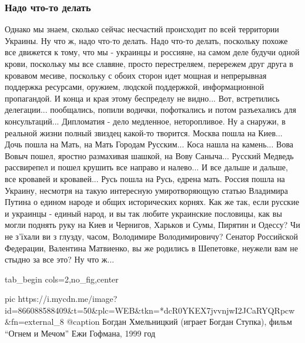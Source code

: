  
 
 
 
 

\subsubsection{Надо что-то делать}

Однако мы знаем, сколько сейчас несчастий происходит по всей территории
Украины. Ну что ж, надо что-то делать. Надо что-то делать, поскольку похоже все
движется к тому, что мы - украинцы и россияне, на самом деле будучи одной
крови, поскольку мы все славяне, просто перестреляем, перережем друг друга в
кровавом месиве, поскольку с обоих сторон идет мощная и непрерывная поддержка
ресурсами, оружием, людской поддержкой, информационной пропагандой. И конца и
края этому беспределу не видно... Вот, встретились делегации... пообщались,
попили водички, пофоткались и потом разъехались для консультаций... Дипломатия
- дело медленное, неторопливое. Ну а снаружи, в реальной жизни полный звиздец
какой-то творится. Москва пошла на Киев... Дочь пошла на Мать, на Мать Городам
Русским... Коса нашла на камень... Вова Вовыч пошел, яростно размахивая шашкой,
на Вову Саныча... Русский Медведь рассвирепел и пошел крушить все направо и
налево... И все дальше и дальше, все кровавей и кровавей... Русь пошла на Русь,
едрена мать. Россия пошла на Украину, несмотря на такую интересную
умиротворяющую статью Владимира Путина о едином народе и общих исторических
корнях. Как же так, если русские и украинцы - единый народ, и вы так любите
украинские пословицы, как вы могли поднять руку на Киев и Чернигов, Харьков и
Сумы, Пирятин и Одессу? Чи не з'їхали ви з глузду, часом, Володимире Володимировичу? Сенатор
Российской Федерации, Валентина Матвиенко, вы же родились в Шепетовке, неужели
вам не стыдно за все это? Ну что ж... 

\ifcmt
  tab_begin cols=2,no_fig,center

		 pic https://i.mycdn.me/image?id=866088588409&t=50&plc=WEB&tkn=*dcR0YKEX7jvvnjwI2JCaRYQRpcw&fn=external_8
		 @caption Богдан Хмельницкий (играет Богдан Ступка), фильм \enquote{Огнем и Мечом} Ежи Гофмана, 1999 год

